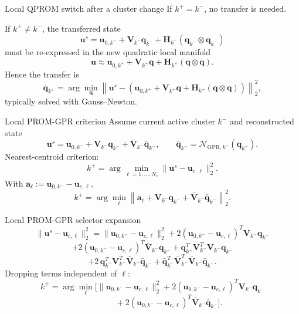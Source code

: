 \documentclass{beamer}
\begin{document}
\begin{frame}{Local QPROM switch after a cluster change}
\small
If $k^+=k^-$, no transfer is needed.

If $k^+\neq k^-$, the transferred state
\[
\mathbf u^s
=
\mathbf u_{0,k^-}
+
\mathbf V_{k^-}\mathbf q_{k^-}
+
\mathbf H_{k^-}(\mathbf q_{k^-}\otimes\mathbf q_{k^-})
\]
must be re-expressed in the new quadratic local manifold
\[
\mathbf u
\approx
\mathbf u_{0,k^+}
+
\mathbf V_{k^+}\mathbf q
+
\mathbf H_{k^+}(\mathbf q\otimes\mathbf q).
\]
Hence the transfer is
\[
\mathbf q_{k^+}
=
\arg\min_{\mathbf q}
\left\|
\mathbf u^s
-
\left(
\mathbf u_{0,k^+}
+
\mathbf V_{k^+}\mathbf q
+
\mathbf H_{k^+}(\mathbf q\otimes\mathbf q)
\right)
\right\|_2^2,
\]
typically solved with Gauss--Newton.
\end{frame}

\begin{frame}{Local PROM-GPR criterion}
\small
Assume current active cluster $k^-$ and reconstructed state
\[
\mathbf u^s
=
\mathbf u_{0,k^-}
+
\mathbf V_{k^-}\mathbf q_{k^-}
+
\bar{\mathbf V}_{k^-}\bar{\mathbf q}_{k^-},
\qquad
\bar{\mathbf q}_{k^-}
=
\mathcal N_{\mathrm{GPR},k^-}(\mathbf q_{k^-}).
\]
Nearest-centroid criterion:
\[
k^+
=
\arg\min_{\ell=1,\dots,N_c}
\|\mathbf u^s-\mathbf u_{c,\ell}\|_2^2.
\]
With $\mathbf a_\ell:=\mathbf u_{0,k^-}-\mathbf u_{c,\ell}$,
\[
k^+
=
\arg\min_\ell
\left\|
\mathbf a_\ell
+
\mathbf V_{k^-}\mathbf q_{k^-}
+
\bar{\mathbf V}_{k^-}\bar{\mathbf q}_{k^-}
\right\|_2^2.
\]
\end{frame}

\begin{frame}{Local PROM-GPR selector expansion}
\scriptsize
\[
\|\mathbf u^s-\mathbf u_{c,\ell}\|_2^2
=
\|\mathbf u_{0,k^-}-\mathbf u_{c,\ell}\|_2^2
+
2(\mathbf u_{0,k^-}-\mathbf u_{c,\ell})^T\mathbf V_{k^-}\mathbf q_{k^-}
\]
\[
+
2(\mathbf u_{0,k^-}-\mathbf u_{c,\ell})^T\bar{\mathbf V}_{k^-}\bar{\mathbf q}_{k^-}
+
\mathbf q_{k^-}^T\mathbf V_{k^-}^T\mathbf V_{k^-}\mathbf q_{k^-}
\]
\[
+
2\,\mathbf q_{k^-}^T\mathbf V_{k^-}^T\bar{\mathbf V}_{k^-}\bar{\mathbf q}_{k^-}
+
\bar{\mathbf q}_{k^-}^T\bar{\mathbf V}_{k^-}^T\bar{\mathbf V}_{k^-}\bar{\mathbf q}_{k^-}.
\]
Dropping terms independent of $\ell$:
\[
k^+
=
\arg\min_\ell
\Big[
\|\mathbf u_{0,k^-}-\mathbf u_{c,\ell}\|_2^2
+
2(\mathbf u_{0,k^-}-\mathbf u_{c,\ell})^T\mathbf V_{k^-}\mathbf q_{k^-}
\]
\[
\qquad\qquad
+
2(\mathbf u_{0,k^-}-\mathbf u_{c,\ell})^T\bar{\mathbf V}_{k^-}\bar{\mathbf q}_{k^-}
\Big].
\]
\end{frame}
\end{document}
